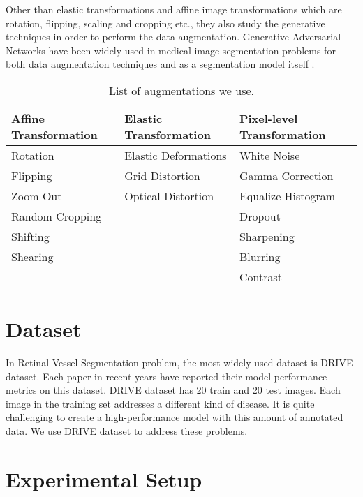 \documentclass{article}
\makeatletter
\newcommand\footnoteref[1]{\protected@xdef\@thefnmark{\ref{#1}}\@footnotemark}
\makeatother
\begin{document}
Other than elastic transformations and affine image transformations which are rotation, flipping, scaling and cropping etc., they also study the generative techniques in order to perform the data augmentation. Generative Adversarial Networks have been widely used in medical image segmentation problems for both data augmentation techniques and as a segmentation model itself \cite{article2, 10.3389/fncom.2019.00083}.
\begin{table}
\caption{List of augmentations we use. \label{augmentations}}
\centering
\begin{tabular}{|l|l|l|} 
\hline
\textbf{Affine Transformation} & \textbf{Elastic Transformation} & \textbf{Pixel-level Transformation}  \\ 
\hline
Rotation                       & Elastic Deformations            & White Noise                          \\ 
\hline
Flipping                       & Grid Distortion                 & Gamma Correction                     \\ 
\hline
Zoom Out                       & Optical Distortion              & Equalize Histogram                   \\ 
\hline
Random Cropping                &                                 & Dropout                              \\ 
\hline
Shifting                       &                                 & Sharpening                           \\ 
\hline
Shearing                       &                                 & Blurring                             \\ 
\hline
                               &                                 & Contrast                             \\
\hline
\end{tabular}
\end{table}
\section{Dataset}
In Retinal Vessel Segmentation problem, the most widely used dataset is DRIVE\footnoteref{drive} dataset. Each paper in recent years have reported their model performance metrics on this dataset. DRIVE dataset has 20 train and 20 test images. Each image in the training set addresses a different kind of disease. It is quite challenging to create a high-performance model with this amount of annotated data. We use DRIVE dataset to address these problems.
\section{Experimental Setup}
\end{document}
